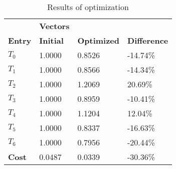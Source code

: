 \begin{table}[h!]
\centering
\begin{tabular}{llll}
\textbf{}      & \cellcolor[HTML]{EFEFEF}\textbf{Vectors} & \textbf{} & \textbf{}         \\
\rowcolor[HTML]{EFEFEF} 
\textbf{Entry} & \textbf{Initial} & \textbf{Optimized} & \textbf{Difference} \\
$T_0$ & 1.0000 & 0.8526 & -14.74\% \\ 
$T_1$ & 1.0000 & 0.8566 & -14.34\% \\ 
$T_2$ & 1.0000 & 1.2069 & 20.69\% \\ 
$T_3$ & 1.0000 & 0.8959 & -10.41\% \\ 
$T_4$ & 1.0000 & 1.1204 & 12.04\% \\ 
$T_5$ & 1.0000 & 0.8337 & -16.63\% \\ 
$T_6$ & 1.0000 & 0.7956 & -20.44\% \\ 
\rowcolor[HTML]{EFEFEF} 
\textbf{Cost}  & 0.0487 & 0.0339 & -30.36\% \\ 
\end{tabular}
\caption{Results of optimization}
\label{tab:OptimizationAnalysis}
\end{table}